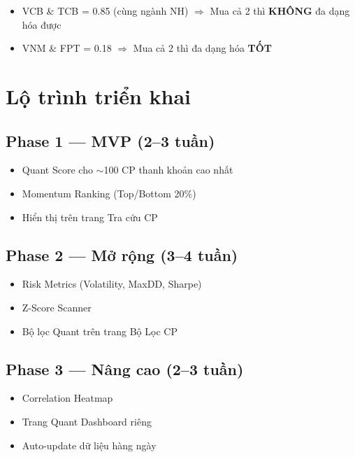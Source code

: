 \documentclass[12pt,a4paper]{article}
\begin{document}
\begin{itemize}
  \item \textcolor{red-neg}{VCB \& TCB = 0.85} (cùng ngành NH) $\Rightarrow$ Mua cả 2 thì \textbf{KHÔNG} đa dạng hóa được
  \item \textcolor{green-pos}{VNM \& FPT = 0.18} $\Rightarrow$ Mua cả 2 thì đa dạng hóa \textbf{TỐT}
\end{itemize}

\newpage
\section{Lộ trình triển khai}

\subsection{Phase 1 — MVP (2--3 tuần)}
\begin{itemize}
  \item Quant Score cho $\sim$100 CP thanh khoản cao nhất
  \item Momentum Ranking (Top/Bottom 20\%)
  \item Hiển thị trên trang Tra cứu CP
\end{itemize}

\subsection{Phase 2 — Mở rộng (3--4 tuần)}
\begin{itemize}
  \item Risk Metrics (Volatility, MaxDD, Sharpe)
  \item Z-Score Scanner
  \item Bộ lọc Quant trên trang Bộ Lọc CP
\end{itemize}

\subsection{Phase 3 — Nâng cao (2--3 tuần)}
\begin{itemize}
  \item Correlation Heatmap
  \item Trang Quant Dashboard riêng
  \item Auto-update dữ liệu hàng ngày
\end{itemize}

\end{document}
